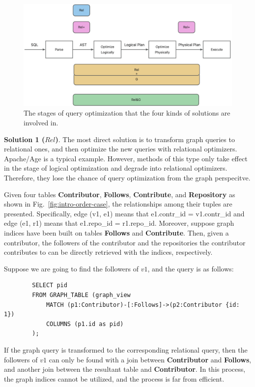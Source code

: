\begin{figure}
    \centering
    \includegraphics[width=.6\linewidth]{./figures/catagory.png}
    \caption{The stages of query optimization that the four kinds of solutions are involved in.}
    \label{fig:catagory}
\end{figure}

\textbf{Solution 1 ($Rel$)}. 
The most direct solution is to transform graph queries to relational ones, and then optimize the new queries with relational optimizers.
Apache/Age is a typical example.
However, methods of this type only take effect in the stage of logical optimization and degrade into relational optimizers.
Therefore, they lose the chance of query optimization from the graph perspecitve.

\begin{example}
    Given four tables \textbf{Contributor}, \textbf{Follows}, \textbf{Contribute}, and \textbf{Repository} as shown in Fig.~\ref{fig:intro-order-case}, the relationships among their tuples are presented.
    Specifically, edge (v1, e1) means that e1.contr\_id = v1.contr\_id and edge (e1, r1) means that e1.repo\_id = r1.repo\_id.
    Moreover, suppose graph indices have been built on tables \textbf{Follows} and \textbf{Contribute}.
    Then, given a contributor, the followers of the contributor and the repositories the contributor contributes to can be directly retrieved with the indices, respectively.

    Suppose we are going to find the followers of $v1$, and the query is as follows:
    \begin{lstlisting}
        SELECT pid
        FROM GRAPH_TABLE (graph_view
            MATCH (p1:Contributor)-[:Follows]->(p2:Contributor {id: 1})
            COLUMNS (p1.id as pid)
        );
    \end{lstlisting}
    If the graph query is transformed to the corresponding relational query, then the followers of $v1$ can only be found with a join between \textbf{Contributor} and \textbf{Follows}, and another join between the resultant table and \textbf{Contributor}.
    In this process, the graph indices cannot be utilized, and the process is far from efficient.
\end{example}


